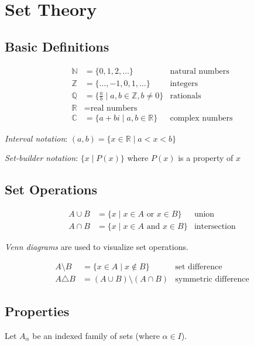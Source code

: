 \documentclass[12pt,a4paper]{article}
\begin{document}
\section{Set Theory}

\subsection{Basic Definitions}

\begin{align*}
\mathbb{N} &= \{0, 1, 2, \ldots\} & \text{natural numbers} \\
\mathbb{Z} &= \{\ldots, -1, 0, 1, \ldots\} & \text{integers} \\
\mathbb{Q} &= \{\frac{a}{b} \mid a,b \in \mathbb{Z}, b \neq 0\} & \text{rationals} \\
\mathbb{R} &= \text{real numbers} \\
\mathbb{C} &= \{a + bi \mid a,b \in \mathbb{R}\} & \text{complex numbers}
\end{align*}

\textit{Interval notation}: $(a,b) = \{x \in \mathbb{R} \mid a < x < b\}$

\textit{Set-builder notation}: $\{x \mid P(x)\}$ where $P(x)$ is a property of $x$

\subsection{Set Operations}

\begin{align*}
A \cup B &= \{x \mid x \in A \text{ or } x \in B\} & \text{union} \\
A \cap B &= \{x \mid x \in A \text{ and } x \in B\} & \text{intersection}
\end{align*}

\textit{Venn diagrams} are used to visualize set operations.

\begin{align*}
A \setminus B &= \{x \in A \mid x \notin B\} & \text{set difference} \\
A \triangle B &= (A \cup B) \setminus (A \cap B) & \text{symmetric difference}
\end{align*}

\subsection{Properties}

Let $A_\alpha$ be an indexed family of sets (where $\alpha \in I$).
\end{document}
